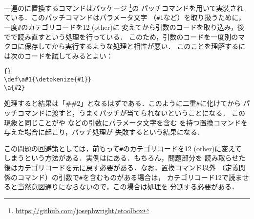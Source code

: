 \documentclass[lualatex,ja=standard,magstyle=real]{bxjsarticle}
\begin{document}
一連のに置換するコマンドはパッケージ
\footnote{\url{https://github.com/josephwright/etoolbox}}の
パッチコマンドを用いて実装されている．このパッチコマンドはパラメータ文字
（\texttt{\#1}など）を取り扱うために，一度\texttt{\#}のカテゴリコードを12 (other)に
変えてから引数のコードを取り込み，後でで読み直すという処理を行っている．
このため，引数のコードを一度別のマクロに保存してから実行するような処理と相性が悪い．
このことを理解するには次のコードを試してみるとよい：
\begin{lstlisting}[style=latex]{}
\def\a#1{\detokenize{#1}}
\a{#2}
\end{lstlisting}
処理すると結果は「\#\#2」となるはずである．このように二重\texttt{\#}に化けてから
パッチコマンドに渡すと，うまくパッチが当てられないということになる．
この現象と同じことがや
などの引数にパラメータ文字を含む
を持つ置換コマンドを与えた場合に起こり，パッチ処理が
失敗するという結果になる．

この問題の回避策としては，前もって\texttt{\#}のカテゴリコードを12 (other)に変えて
しまうという方法がある．実例はにある．もちろん，問題部分を
読み取らせた後はカテゴリコードを元に戻す必要がある．なお，置換コマンド以外
（定義関係のコマンド）の引数で\texttt{\#}を含むものがある場合は，
カテゴリコード12で読ませると当然意図通りにならないので，この場合は処理を
分割する必要がある．
\end{document}
